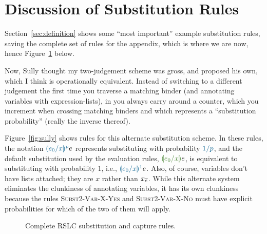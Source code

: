 \documentclass[10pt]{sigplanconf}
\begin{document}



\onecolumn

\appendix

\section{Discussion of Substitution Rules}

Section~\ref{sec:definition} shows some ``most important'' example substitution rules, saving the complete set of rules for the appendix, which is where we are now, hence Figure~\ref{fig:subst-complete} below.

Now, Sully thought my two-judgement scheme was gross, and proposed his own, which I think is operationally equivalent.
Instead of switching to a different judgement the first time you traverse a matching binder (and annotating variables with expression-lists), in you always carry around a counter, which you increment when crossing matching binders and which represents a ``substitution probability'' (really the inverse thereof).

Figure~\ref{fig:sully} shows rules for this alternate substitution scheme.
In these rules, the notation $\sully{e_0}{x}{p}{e}$ represents substituting with probability $\sullycolor{1/p}$, and the default substitution used by the evaluation rules, $\subst{e_0}{x}{e}$, is equivalent to substituting with probability $1$, i.e., $\sully{e_0}{x}{1}{e}$.
Also, of course, variables don't have lists attached; they are $x$ rather than $x_{\overline{e}}$.
While this alternate system eliminates the clunkiness of annotating variables, it has its own clunkiness because the rules \textsc{Subst2-Var-X-Yes} and \textsc{Subst2-Var-X-No} must have explicit probabilities for which of the two of them will apply.

\begin{figure}[h!]
	\TypeRules{
		\SubstLamCapture \qquad \SubstLam \qquad
		\SubstApp \\
		\SubstVarX \qquad \SubstVarY \\
		\SubstCaseCapture \\ \SubstCase \\
		\SubstZero \qquad \SubstSuc \\
		\SubstLetCapture \qquad \SubstLet
	}
	\TypeRules{
		\CaptureLam \qquad \CaptureApp \qquad
		\CaptureVarX \qquad \CaptureVarY \\
		\CaptureCase \\
		\CaptureZero \qquad \CaptureSuc \qquad \CaptureLet
	}
	\caption{Complete RSLC substitution and capture rules.}
	\label{fig:subst-complete}
\end{figure}
\end{document}
